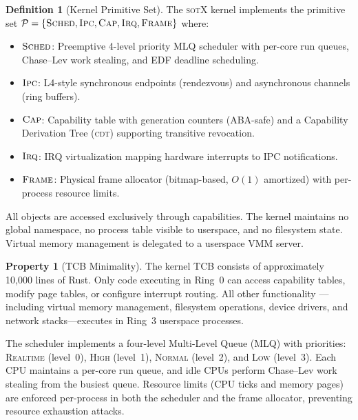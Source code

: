 \documentclass[11pt,a4paper]{article}
\theoremstyle{definition}
\newtheorem{definition}{Definition}[section]
\newtheorem{property}{Property}[section]
\theoremstyle{remark}
\newcommand{\sotx}{\textsc{sotX}}
\newcommand{\CDT}{\textsc{cdt}}
\begin{document}
\begin{definition}[Kernel Primitive Set]
\label{def:primitives}
The \sotx{} kernel implements the primitive set
$\mathcal{P} = \{\textsc{Sched}, \textsc{Ipc}, \textsc{Cap},
\textsc{Irq}, \textsc{Frame}\}$ where:
\begin{itemize}[leftmargin=1.4em]
\item $\textsc{Sched}$: Preemptive 4-level priority MLQ scheduler
  with per-core run queues, Chase--Lev work stealing, and EDF
  deadline scheduling.
\item $\textsc{Ipc}$: L4-style synchronous endpoints (rendezvous)
  and asynchronous channels (ring buffers).
\item $\textsc{Cap}$: Capability table with generation counters
  (ABA-safe) and a Capability Derivation Tree (\CDT{}) supporting
  transitive revocation.
\item $\textsc{Irq}$: IRQ virtualization mapping hardware interrupts
  to IPC notifications.
\item $\textsc{Frame}$: Physical frame allocator (bitmap-based,
  $O(1)$ amortized) with per-process resource limits.
\end{itemize}
\end{definition}

All objects are accessed exclusively through capabilities. The kernel
maintains no global namespace, no process table visible to userspace,
and no filesystem state. Virtual memory management is delegated to a
userspace VMM server.

\begin{property}[TCB Minimality]
\label{prop:tcb}
The kernel TCB consists of approximately 10{,}000 lines of Rust.
Only code executing in Ring~0 can access capability tables, modify
page tables, or configure interrupt routing. All other functionality
---including virtual memory management, filesystem operations, device
drivers, and network stacks---executes in Ring~3 userspace processes.
\end{property}

The scheduler implements a four-level Multi-Level Queue (MLQ) with
priorities: \textsc{Realtime} (level~0), \textsc{High} (level~1),
\textsc{Normal} (level~2), and \textsc{Low} (level~3). Each CPU
maintains a per-core run queue, and idle CPUs perform Chase--Lev
work stealing from the busiest queue. Resource limits (CPU ticks
and memory pages) are enforced per-process in both the scheduler
and the frame allocator, preventing resource exhaustion attacks.
\end{document}
